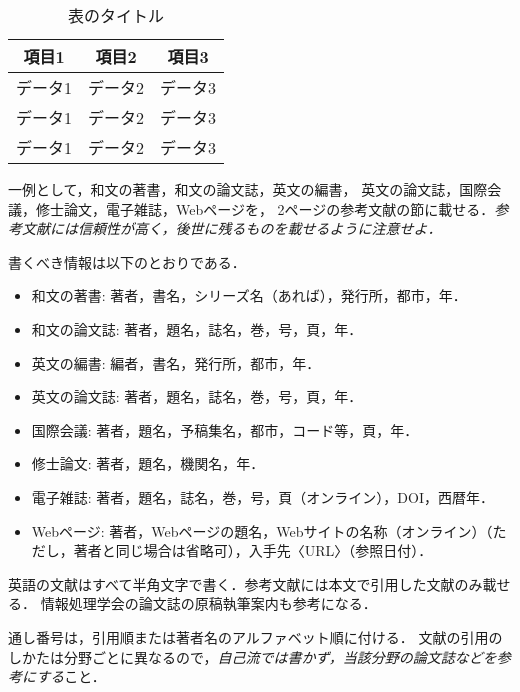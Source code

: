 \documentclass[a4j,12pt]{jreport}
\begin{document}
\begin {table}[t]
    \centering
  \caption{表のタイトル}
  \label{tab:results}
  \begin {tabular}{ccc} \hline
     項目1 & 項目2 & 項目3 \\ \hline
    データ1 & データ2 & データ3 \\
    データ1 & データ2 & データ3 \\
    データ1 & データ2 & データ3 \\ \hline
  \end {tabular}
\end {table}



一例として，和文の著書\cite{suetake}，和文の論文誌\cite{kusano}，英文の編書\cite{fuortes}，
英文の論文誌\cite{rice}，国際会議\cite{guibas}，修士論文\cite{chudai}，電子雑誌\cite{iwama}，Webページ\cite{IPSJ}を，
2ページの参考文献の節に載せる．{\em 参考文献には信頼性が高く，後世に残るものを載せるように注意せよ．}

書くべき情報は以下のとおりである．
\begin{itemize}
\item 和文の著書: 著者，書名，シリーズ名（あれば），発行所，都市，年．
\item 和文の論文誌: 著者，題名，誌名，巻，号，頁，年．
\item 英文の編書: 編者，書名，発行所，都市，年．
\item 英文の論文誌: 著者，題名，誌名，巻，号，頁，年．
\item 国際会議: 著者，題名，予稿集名，都市，コード等，頁，年．
\item 修士論文: 著者，題名，機関名，年．
\item 電子雑誌: 著者，題名，誌名，巻，号，頁（オンライン），DOI，西暦年．
\item Webページ: 著者，Webページの題名，Webサイトの名称（オンライン）（ただし，著者と同じ場合は省略可），入手先〈URL〉（参照日付）．
\end{itemize}
英語の文献はすべて半角文字で書く．参考文献には本文で引用した文献のみ載せる．
情報処理学会の論文誌の原稿執筆案内\cite{IPSJ}も参考になる．

通し番号は，引用順または著者名のアルファベット順に付ける．
文献の引用のしかたは分野ごとに異なるので，{\em 自己流では書かず，当該分野の論文誌などを参考にする}こと．
\end{document}
